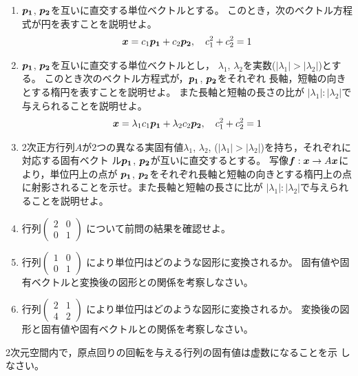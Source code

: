 \documentclass[twocolumn,11pt]{jarticle}
\begin{document}
\nquestion
\begin{enumerate}
\item $\boldsymbol{p_1}$,  $\boldsymbol{p_2}$を互いに直交する単位ベクトルとする。
  このとき，次のベクトル方程式が円を表すことを説明せよ。
  \begin{align}
    \boldsymbol{x}=c_1\boldsymbol{p_1}+c_2\boldsymbol{p_2},\quad c_1^2+c_2^2=1\notag
  \end{align}
\item $\boldsymbol{p_1}$,  $\boldsymbol{p_2}$を互いに直交する単位ベクトルとし，
  $\lambda_1$, $\lambda_2$を実数($|\lambda_1|>|\lambda_2|$)とする。
  このとき次のベクトル方程式が，$\boldsymbol{p_1}$,  $\boldsymbol{p_2}$をそれぞれ
  長軸，短軸の向きとする楕円を表すことを説明せよ。
  また長軸と短軸の長さの比が
  ${|\lambda_1|:|\lambda_2|}$で与えられることを説明せよ。
  \begin{align}
    \boldsymbol{x}=
    \lambda_1 c_1\boldsymbol{p_1}+\lambda_2 c_2\boldsymbol{p_2},\quad c_1^2+c_2^2=1\notag
  \end{align}
\item 2次正方行列$A$が2つの異なる実固有値$\lambda_1$, $\lambda_2$, 
  ($|\lambda_1|>|\lambda_2|$)を持ち，それぞれに対応する固有ベクト
  ル$\boldsymbol{p_1}$, $\boldsymbol{p_2}$が互いに直交するとする。
  写像$\boldsymbol{f}: \boldsymbol{x} \to A\boldsymbol{x}$により，単位円上の点が
  $\boldsymbol{p_1}$, $\boldsymbol{p_2}$をそれぞれ長軸と短軸の向きとする楕円上の点
  に射影されることを示せ。また長軸と短軸の長さに比が
  ${|\lambda_1|:|\lambda_2|}$で与えられることを説明せよ。
\item
  行列$\begin{pmatrix}
      2 & 0\\
      0 & 1
    \end{pmatrix}$
    について前問の結果を確認せよ。
\item
  行列$\begin{pmatrix}
      1 & 0\\
      0 & 1
    \end{pmatrix}$
  により単位円はどのような図形に変換されるか。
  固有値や固有ベクトルと変換後の図形との関係を考察しなさい。
\item 
  行列$\begin{pmatrix}
    2 & 1 \\
    4 & 2
  \end{pmatrix}$
  により単位円はどのような図形に変換されるか。
  変換後の図形と固有値や固有ベクトルとの関係を考察しなさい。
\end{enumerate}

\nquestion
2次元空間内で，原点回りの回転を与える行列の固有値は虚数になることを示
しなさい。
\end{document}
